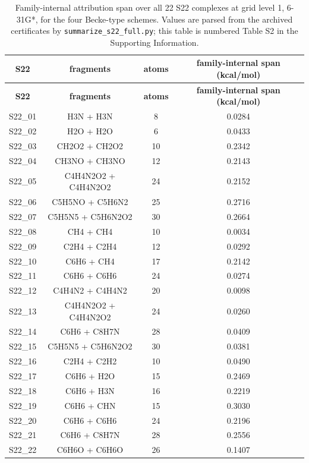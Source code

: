 \documentclass[11pt]{article}
\begin{document}
\footnotesize
\begin{longtable}{cccc}
\caption{Family-internal attribution span over all 22 S22 complexes at grid level 1, 6-31G*, for the four Becke-type schemes. Values are parsed from the archived certificates by \texttt{summarize\_s22\_full.py}; this table is numbered Table S2 in the Supporting Information.}
\label{tab:6}\\
\toprule
\textbf{S22} & \textbf{fragments} & \textbf{atoms} & \textbf{family-internal span (kcal/mol)} \\ \midrule
\endfirsthead
\toprule
\textbf{S22} & \textbf{fragments} & \textbf{atoms} & \textbf{family-internal span (kcal/mol)} \\ \midrule
\endhead
\bottomrule
\endfoot
S22\_01 & H3N + H3N & 8 & 0.0284 \\
S22\_02 & H2O + H2O & 6 & 0.0433 \\
S22\_03 & CH2O2 + CH2O2 & 10 & 0.2342 \\
S22\_04 & CH3NO + CH3NO & 12 & 0.2143 \\
S22\_05 & C4H4N2O2 + C4H4N2O2 & 24 & 0.2152 \\
S22\_06 & C5H5NO + C5H6N2 & 25 & 0.2716 \\
S22\_07 & C5H5N5 + C5H6N2O2 & 30 & 0.2664 \\
S22\_08 & CH4 + CH4 & 10 & 0.0034 \\
S22\_09 & C2H4 + C2H4 & 12 & 0.0292 \\
S22\_10 & C6H6 + CH4 & 17 & 0.2142 \\
S22\_11 & C6H6 + C6H6 & 24 & 0.0274 \\
S22\_12 & C4H4N2 + C4H4N2 & 20 & 0.0098 \\
S22\_13 & C4H4N2O2 + C4H4N2O2 & 24 & 0.0260 \\
S22\_14 & C6H6 + C8H7N & 28 & 0.0409 \\
S22\_15 & C5H5N5 + C5H6N2O2 & 30 & 0.0381 \\
S22\_16 & C2H4 + C2H2 & 10 & 0.0490 \\
S22\_17 & C6H6 + H2O & 15 & 0.2469 \\
S22\_18 & C6H6 + H3N & 16 & 0.2219 \\
S22\_19 & C6H6 + CHN & 15 & 0.3030 \\
S22\_20 & C6H6 + C6H6 & 24 & 0.2196 \\
S22\_21 & C6H6 + C8H7N & 28 & 0.2556 \\
S22\_22 & C6H6O + C6H6O & 26 & 0.1407 \\
\end{longtable}
\normalsize
\end{document}
